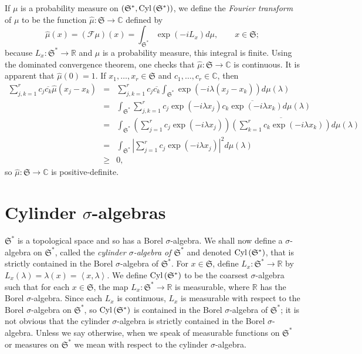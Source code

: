 \documentclass{article}
\newcommand{\inner}[2]{\left\langle #1, #2 \right\rangle}
\newcommand{\Cyl}{\ensuremath\mathrm{Cyl}\,}
\theoremstyle{definition}
\theoremstyle{definition}
\begin{document}
If $\mu$ is a probability measure on $(\mathfrak{S}^*,\Cyl(\mathfrak{S}^*))$, we define the {\em Fourier transform} of $\mu$ to be the function $\hat{\mu}:\mathfrak{S} \to \mathbb{C}$
defined by
\[
\hat{\mu}(x) =(\mathscr{F} \mu)(x)= \int_{\mathfrak{S}^*} \exp(-iL_x) d\mu, \qquad x \in \mathfrak{S};
\]
because $L_x:\mathfrak{S}^* \to \mathbb{R}$ and $\mu$ is a probability measure, this integral is finite. 
 Using the dominated convergence theorem, one checks that
  $\hat{\mu}:\mathfrak{S} \to \mathbb{C}$ is continuous. It is apparent that $\hat{\mu}(0)=1$. 
If $x_1,\ldots,x_r \in \mathfrak{S}$ and $c_1,\ldots,c_r \in \mathbb{C}$, then
\begin{eqnarray*}
\sum_{j,k=1}^r c_j\overline{c_k} \hat{\mu}(x_j-x_k)&=&\sum_{j,k=1}^r c_j \overline{c_k} \int_{\mathfrak{S}^*} \exp(-i\lambda(x_j-x_k)) d\mu(\lambda)\\
&=&\int_{\mathfrak{S}^*} \sum_{j,k=1}^r c_j \exp(-i\lambda x_j) \overline{c_k \exp(-i\lambda x_k)} d\mu(\lambda)\\
&=&\int_{\mathfrak{S}^*} \left( \sum_{j=1}^r c_j \exp(-i\lambda x_j) \right) \overline{\left(\sum_{k=1}^r c_k \exp(-i\lambda x_k) \right)} d\mu(\lambda)\\
&=&\int_{\mathfrak{S}^*} \left| \sum_{j=1}^r c_j \exp(-i\lambda x_j)\right|^2 d\mu(\lambda)\\
&\geq&0,
\end{eqnarray*}
so $\hat{\mu}:\mathfrak{S} \to \mathbb{C}$ is positive-definite. 



\section{Cylinder $\sigma$-algebras}
$\mathfrak{S}^*$ is a topological space and so has a Borel $\sigma$-algebra.
We shall now define a $\sigma$-algebra on $\mathfrak{S}^*$, called the {\em cylinder $\sigma$-algebra of $\mathfrak{S}^*$} and denoted
$\Cyl(\mathfrak{S}^*)$, that is strictly contained in the Borel $\sigma$-algebra of $\mathfrak{S}^*$. 
For $x \in \mathfrak{S}$, define $L_x:\mathfrak{S}^* \to \mathbb{R}$ by $L_x(\lambda)=\lambda(x)=\inner{x}{\lambda}$. 
We define $\Cyl(\mathfrak{S}^*)$ to be the coarsest $\sigma$-algebra such that for each $x \in \mathfrak{S}$, the map $L_x:\mathfrak{S}^* \to \mathbb{R}$
is measurable, where $\mathbb{R}$ has the Borel $\sigma$-algebra. Since each $L_x$ is continuous, $L_x$  is measurable with respect to the Borel
$\sigma$-algebra on $\mathfrak{S}^*$, so
$\Cyl(\mathfrak{S}^*)$ is contained in the Borel $\sigma$-algebra of $\mathfrak{S}^*$; it is not obvious 
that the cylinder $\sigma$-algebra is strictly contained in the Borel $\sigma$-algebra.
Unless we say otherwise, when we speak of measurable functions on $\mathfrak{S}^*$ or measures on $\mathfrak{S}^*$ we mean with
respect to the cylinder $\sigma$-algebra.
\end{document}
